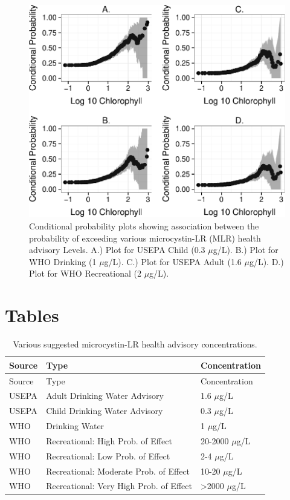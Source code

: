 \documentclass[11pt,]{article}
\begin{document}
\begin{figure}[htbp]
\centering
\includegraphics{manuscript_files/figure-latex/epa_child_cp_plot-1.pdf}
\caption{Conditional probability plots showing association between the
probability of exceeding various microcystin-LR (MLR) health advisory
Levels. A.) Plot for USEPA Child (0.3 \(\mu\)g/L). B.) Plot for WHO
Drinking (1 \(\mu\)g/L). C.) Plot for USEPA Adult (1.6 \(\mu\)g/L). D.)
Plot for WHO Recreational (2 \(\mu\)g/L). \label{fig:multi_cp_plot}}
\end{figure}

\newpage

\section{Tables}\label{tables}

\begin{longtable}[c]{@{}lll@{}}
\caption{Various suggested microcystin-LR health advisory
concentrations. \label{tab:microcystin_levels}}\tabularnewline
\toprule
Source & Type & Concentration\tabularnewline
\midrule
\endfirsthead
\toprule
Source & Type & Concentration\tabularnewline
\midrule
\endhead
USEPA & Adult Drinking Water Advisory & 1.6 \(\mu\)g/L\tabularnewline
USEPA & Child Drinking Water Advisory & 0.3 \(\mu\)g/L\tabularnewline
WHO & Drinking Water & 1 \(\mu\)g/L\tabularnewline
WHO & Recreational: High Prob. of Effect & 20-2000
\(\mu\)g/L\tabularnewline
WHO & Recreational: Low Prob. of Effect & 2-4 \(\mu\)g/L\tabularnewline
WHO & Recreational: Moderate Prob. of Effect & 10-20
\(\mu\)g/L\tabularnewline
WHO & Recreational: Very High Prob. of Effect & \textgreater{}2000
\(\mu\)g/L\tabularnewline
\bottomrule
\end{longtable}
\end{document}
